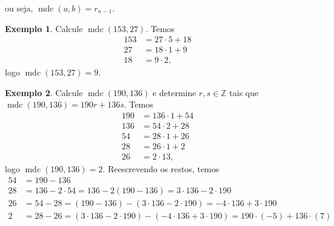 \documentclass[a4paper,11pt,twoside, leqno]{article}
\DeclareMathOperator{\mdc}{mdc}
\theoremstyle{definition}
\newtheorem*{example}{Exemplo}
\begin{document}
ou seja, $\mdc(a,b) = r_{n-1}$.
\begin{example}
	Calcule $\mdc(153, 27)$. Temos
	\begin{align*}
	153 &= 27\cdot 5 + 18 \\
	27 &= 18\cdot 1 + 9 \\
	18 &= 9\cdot 2,  
	\end{align*}
	logo $\mdc(153, 27) = 9$.
\end{example}
\begin{example}
	Calcule $\mdc(190, 136)$ e determine $r,s\in\mathbb{Z}$ tais que $\mdc(190,136) = 190r + 136s$. Temos
	\begin{align*}
	190 &= 136\cdot 1 + 54 \\
	136 &= 54\cdot 2 + 28 \\
	54 &= 28\cdot 1 + 26 \\
	28 &= 26\cdot 1 + 2 \\
	26 &= 2\cdot 13, 
	\end{align*}
	logo $\mdc(190, 136) = 2$. Reescrevendo os restos, temos
	\begin{align*}
	54 &= 190 - 136 \\
	28 &= 136 - 2\cdot 54 = 136 - 2(190 - 136) = 3\cdot 136 - 2\cdot 190 \\
	26 &= 54 - 28 = (190 - 136) - (3\cdot 136 - 2\cdot 190) = -4\cdot 136 + 3\cdot 190 \\
	2 &= 28 - 26 = (3\cdot 136 - 2\cdot 190) - (-4\cdot 136 + 3\cdot 190) = 190\cdot(-5) + 136\cdot(7)
	\end{align*}
\end{example}
\end{document}
